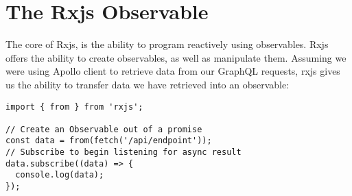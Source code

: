 \section{The Rxjs Observable}
The core of Rxjs, is the ability to program reactively using observables. Rxjs 
offers the ability to create observables, as well as manipulate them. Assuming 
we were using Apollo client to retrieve data from our GraphQL requests, rxjs 
gives us the ability to transfer data we have retrieved into an observable: 
\begin{lstlisting}
import { from } from 'rxjs';

// Create an Observable out of a promise
const data = from(fetch('/api/endpoint'));
// Subscribe to begin listening for async result
data.subscribe((data) => {
  console.log(data);
});  
\end{lstlisting}